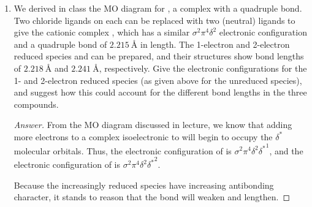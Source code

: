 \documentclass[../psets.tex]{subfiles}
\begin{document}
\begin{enumerate}[label={\Roman*)}]
\begin{enumerate}[label={\textbf{10.\arabic*}}]
\begin{enumerate}[label={\textbf{\alph*.}}]
\begin{enumerate}[label={\textbf{\arabic*.}}]
\begin{proof}[Answer]
\begin{center}
                    \end{center}
                \end{proof}
                \item Which interaction would you expect to be the strongest, and why?
                \begin{proof}[Answer]
                    The $d_{z^2}$ interaction should be the strongest. In the MO energy diagram for  bonding, the hydrogen orbitals are closest in energy to the metal $d$ orbitals. It stands to reason that it would be similar for square pyramidal bonding and deuterium.
                \end{proof}
            \end{enumerate}
        \end{enumerate}
    \end{enumerate}
    \newpage
    \item We derived in class the MO diagram for , a complex with a  quadruple bond. Two chloride ligands on each  can be replaced with two (neutral)  ligands to give the cationic complex , which has a similar $\sigma^2\pi^4\delta^2$ electronic configuration and a  quadruple bond of $\SI{2.215}{\angstrom}$ in length. The 1-electron and 2-electron reduced species  and  can be prepared, and their structures show  bond lengths of $\SI{2.218}{\angstrom}$ and $\SI{2.241}{\angstrom}$, respectively. Give the electronic configurations for the 1- and 2-electron reduced species (as given above for the unreduced species), and suggest how this could account for the different  bond lengths in the three compounds.
    \begin{proof}[Answer]
        From the MO diagram discussed in lecture, we know that adding more electrons to a complex isoelectronic to  will begin to occupy the $\delta^*$ molecular orbitals. Thus, the electronic configuration of  is $\sigma^2\pi^4\delta^2{\delta^*}^1$, and the electronic configuration of  is $\sigma^2\pi^4\delta^2{\delta^*}^2$.\par
        Because the increasingly reduced species have increasing antibonding character, it stands to reason that the bond will weaken and lengthen.
    \end{proof}
\end{enumerate}
\end{document}
